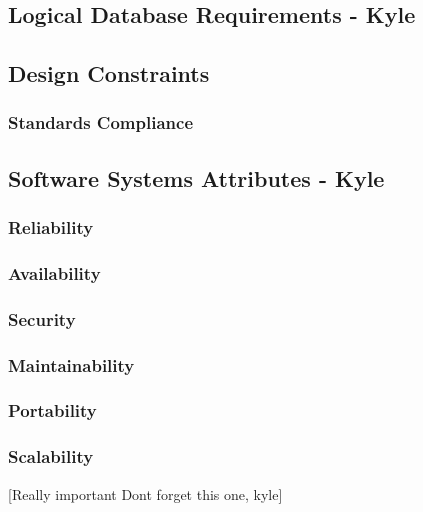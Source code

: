 \documentclass{report}
\begin{document}
\subsection{Logical Database Requirements - Kyle}

\subsection{Design Constraints}

\subsubsection{Standards Compliance}

\subsection{Software Systems Attributes - Kyle}

\subsubsection{Reliability}

\subsubsection{Availability}

\subsubsection{Security}

\subsubsection{Maintainability}

\subsubsection{Portability}

\subsubsection{Scalability}
[Really important Dont forget this one, kyle]


\newpage
\end{document}
